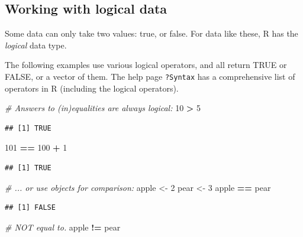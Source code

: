 \documentclass[]{book}
\newenvironment{Shaded}{\begin{snugshade}}{\end{snugshade}}
\newcommand{\CommentTok}[1]{\textcolor[rgb]{0.56,0.35,0.01}{\textit{#1}}}
\newcommand{\DecValTok}[1]{\textcolor[rgb]{0.00,0.00,0.81}{#1}}
\newcommand{\NormalTok}[1]{#1}
\newcommand{\OperatorTok}[1]{\textcolor[rgb]{0.81,0.36,0.00}{\textbf{#1}}}
\newcommand{\StringTok}[1]{\textcolor[rgb]{0.31,0.60,0.02}{#1}}
\begin{document}
\hypertarget{workinglogic}{%
\subsection{Working with logical data}\label{workinglogic}}

Some data can only take two values: true, or false. For data like these, R has the \emph{logical} data type.

The following examples use various logical operators, and all return TRUE or FALSE, or a vector of them. The help page \texttt{?Syntax} has a comprehensive list of operators in R (including the logical operators).

\begin{Shaded}
\begin{Highlighting}[]
\CommentTok{# Answers to (in)equalities are always logical:}
\DecValTok{10} \OperatorTok{>}\StringTok{ }\DecValTok{5}
\end{Highlighting}
\end{Shaded}

\begin{verbatim}
## [1] TRUE
\end{verbatim}

\begin{Shaded}
\begin{Highlighting}[]
\DecValTok{101} \OperatorTok{==}\StringTok{ }\DecValTok{100} \OperatorTok{+}\StringTok{ }\DecValTok{1}
\end{Highlighting}
\end{Shaded}

\begin{verbatim}
## [1] TRUE
\end{verbatim}

\begin{Shaded}
\begin{Highlighting}[]
\CommentTok{# ... or use objects for comparison:}
\NormalTok{apple <-}\StringTok{ }\DecValTok{2}
\NormalTok{pear <-}\StringTok{ }\DecValTok{3}
\NormalTok{apple }\OperatorTok{==}\StringTok{ }\NormalTok{pear}
\end{Highlighting}
\end{Shaded}

\begin{verbatim}
## [1] FALSE
\end{verbatim}

\begin{Shaded}
\begin{Highlighting}[]
\CommentTok{# NOT equal to.}
\NormalTok{apple }\OperatorTok{!=}\StringTok{ }\NormalTok{pear}
\end{Highlighting}
\end{Shaded}
\end{document}
